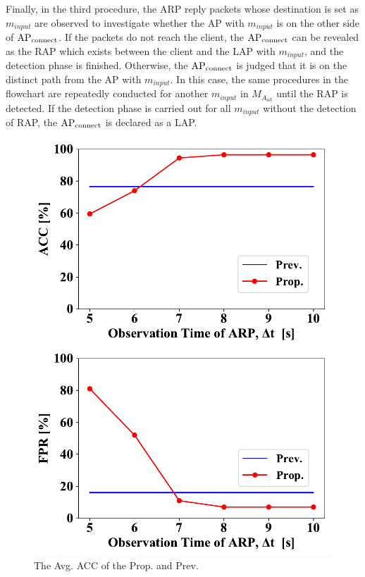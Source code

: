 \documentclass[conference]{IEEEtran}
\newcommand{\tarAP}{\rm AP_{connect}}
\newcommand{\inputMAC}{m_{input}}
\begin{document}
Finally, in the third procedure, the ARP reply packets whose destination is set as $\inputMAC$ are observed to investigate whether the AP with $\inputMAC$ is on the other side of $\tarAP$.
If the packets do not reach the client, the $\tarAP$ can be revealed as the RAP which exists between the client and the LAP with $\inputMAC$, and the detection phase is finished.
Otherwise, the $\tarAP$ is judged that it is on the distinct path from the AP with $\inputMAC$.
In this case, the same procedures in the flowchart are repeatedly conducted for another $\inputMAC$ in $M_{A_{all}}$ until the RAP is detected.
If the detection phase is carried out for all $\inputMAC$ without the detection of RAP, the $\tarAP$ is declared as a LAP. 
\begin{figure}[ht]
    \begin{minipage}{0.33\hsize}
        \begin{center}
            \includegraphics[scale=0.35]{figure/ACC.pdf}
        \end{center}
        \caption{The Avg. ACC of the Prop. and Prev.}
        \label{fig:acc}
    \end{minipage}
        \begin{minipage}{0.33\hsize}
        \begin{center}
            \includegraphics[scale=0.35]{figure/FPR.pdf}

\end{center}
\end{minipage}
\end{figure}
\end{document}
